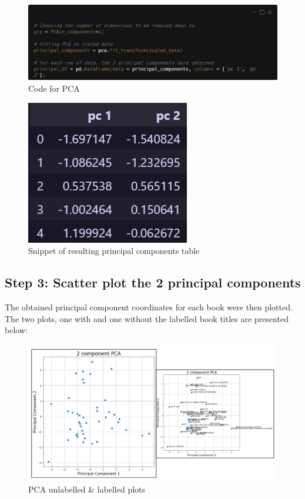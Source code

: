 \documentclass[12pt]{article}
\begin{document}
\begin{figure}[H]
	\includegraphics[width=\textwidth]{code2}
	\centering
	\caption{Code for PCA}
\end{figure}
\vspace{-1em}
\begin{figure}[H]
	\includegraphics[scale=0.4]{3}
	\centering
	\caption{Snippet of resulting principal components table}
\end{figure}

\subsection{Step 3: Scatter plot the 2 principal components}
The obtained principal component coordinates for each book were then plotted. The two plots, one with and one without the labelled book titles are presented below:

\begin{figure}[H]
	\includegraphics[scale=0.4]{4}
	\centering
	\caption{PCA unlabelled \& labelled plots}
\end{figure}
\end{document}
